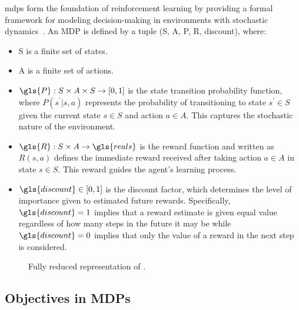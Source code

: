 \Glspl{mdp} form the foundation of reinforcement learning by providing 
a formal framework for modeling decision-making in environments with 
stochastic dynamics~\cite{puterman2005}. An MDP is defined by a tuple 
(\gls{S}, \gls{A}, \gls{P}, \gls{R}, \gls{discount}), where:
\begin{itemize}
    \item \gls{S} is a finite set of states.
    \item \gls{A} is a finite set of actions.
    \item \(\gls{P}: S\times A\times S\rightarrow [0,1]\) is the state 
        transition probability function, where \(P(s^\prime|s, a)\) 
        represents the probability of transitioning to state \(s^\prime\in S\)
        given the current state \(s\in S\) and action \(a\in A\).
        This captures the stochastic nature of the environment.
    \item \(\gls{R}: S \times A \rightarrow \gls{reals}\) is the reward 
        function and written as \(R(s, a)\) defines the immediate reward 
        received after taking action \(a\in A\) in state \(s\in S\). 
        This reward guides the agent's learning process.
    \item \(\gls{discount} \in [0, 1]\) is the discount factor, which 
        determines the level of importance given to estimated future rewards. 
        Specifically, \(\gls{discount}=1\) implies that a reward estimate is 
        given equal value regardless of how many steps in the future it may 
        be while \(\gls{discount}=0\) implies that only the value of a 
        reward in the next step is considered.
\end{itemize}

\begin{figure}
    \centering
    
    \caption{Fully reduced  
        representation of .}
    \label{fig:mdp_cycle}
\end{figure}

    \subsection*{Objectives in MDPs}%

